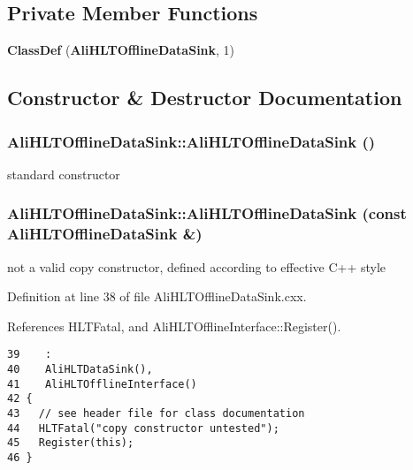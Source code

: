 \subsection*{Private Member Functions}
\begin{CompactItemize}
\item 
{\bf Class\-Def} ({\bf Ali\-HLTOffline\-Data\-Sink}, 1)
\end{CompactItemize}


\subsection{Constructor \& Destructor Documentation}
\subsubsection{\setlength{\rightskip}{0pt plus 5cm}Ali\-HLTOffline\-Data\-Sink::Ali\-HLTOffline\-Data\-Sink ()}\label{classAliHLTOfflineDataSink_a0}


standard constructor 
\subsubsection{\setlength{\rightskip}{0pt plus 5cm}Ali\-HLTOffline\-Data\-Sink::Ali\-HLTOffline\-Data\-Sink (const {\bf Ali\-HLTOffline\-Data\-Sink} \&)}\label{classAliHLTOfflineDataSink_a1}


not a valid copy constructor, defined according to effective C++ style 

Definition at line 38 of file Ali\-HLTOffline\-Data\-Sink.cxx.

References HLTFatal, and Ali\-HLTOffline\-Interface::Register().

\footnotesize\begin{verbatim}39    :
40    AliHLTDataSink(),
41    AliHLTOfflineInterface()
42 {
43   // see header file for class documentation
44   HLTFatal("copy constructor untested");
45   Register(this);
46 }

\end{verbatim}\normalsize 



